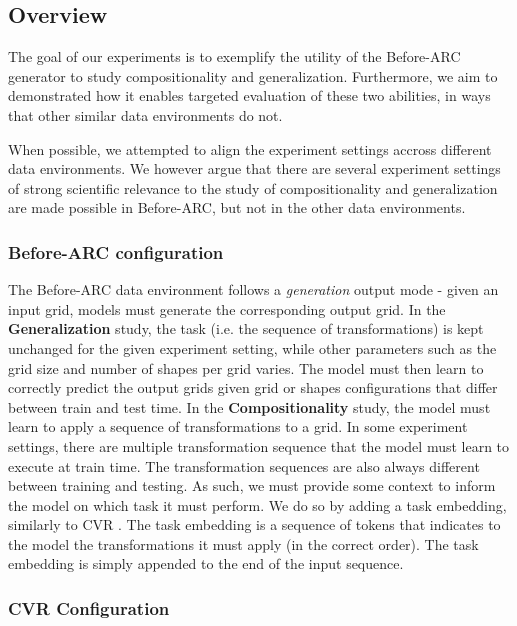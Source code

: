 \subsection{Overview}

The goal of our experiments is to exemplify the utility of the Before-ARC generator to study compositionality and generalization. Furthermore, we aim to demonstrated how it enables targeted evaluation of these two abilities, in ways that other similar data environments do not. 

When possible, we attempted to align the experiment settings accross different data environments. We however argue that there are several experiment settings of strong scientific relevance to the study of compositionality and generalization are made possible in Before-ARC, but not in the other data environments.

\subsubsection{Before-ARC configuration}

The Before-ARC data environment follows a \textit{generation} output mode - given an input grid, models must generate the corresponding output grid. In the \textbf{Generalization} study, the task (i.e. the sequence of transformations) is kept unchanged for the given experiment setting, while other parameters such as the grid size and number of shapes per grid varies. The model must then learn to correctly predict the output grids given grid or shapes configurations that differ between train and test time. In the \textbf{Compositionality} study, the model must learn to apply a sequence of transformations to a grid. In some experiment settings, there are multiple transformation sequence that the model must learn to execute at train time. The transformation sequences are also always different between training and testing. As such, we must provide some context to inform the model on which task it must perform. We do so by adding a task embedding, similarly to CVR \cite{cvr2022}. The task embedding is a sequence of tokens that indicates to the model the transformations it must apply (in the correct order). The task embedding is simply appended to the end of the input sequence. 
 
\subsubsection{CVR Configuration}

